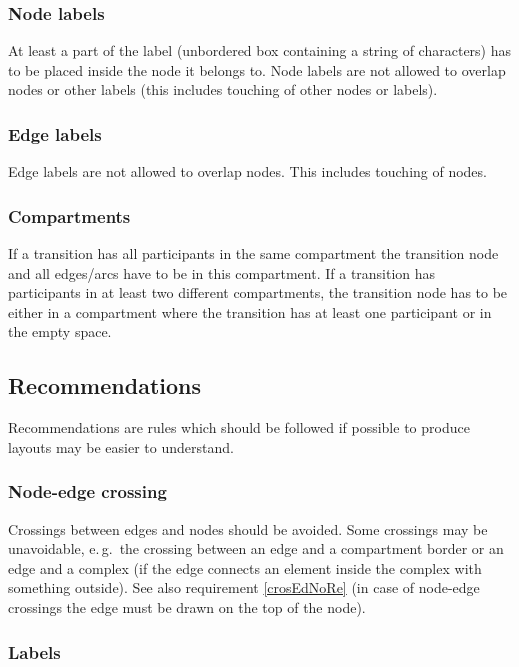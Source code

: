 \subsubsection{Node labels}

At least a part of the label (unbordered box containing a string of
characters) has to be placed inside the node it belongs to. Node
labels are not allowed to overlap nodes or other labels (this
includes touching of other nodes or labels).

\subsubsection{Edge labels}

Edge labels are not allowed to overlap nodes. This includes touching
of nodes.

\subsubsection{Compartments}

If a transition has all participants in the same compartment the
transition node and all edges/arcs have to be in this compartment.
If a transition has participants in at least two different
compartments, the transition node has to be either in a compartment
where the transition has at least one participant or in the empty
space.

\subsection{Recommendations}

Recommendations are rules which should be followed if possible to
produce layouts may be easier to understand.

\subsubsection{Node-edge crossing}\label{crosEdNo}

Crossings between edges and nodes should be avoided. Some crossings
may be unavoidable, e.\,g.~the crossing between an edge and a
compartment border or an edge and a complex (if the edge connects an
element inside the complex with something outside). See also
requirement \ref{crosEdNoRe} (in case of node-edge crossings the
edge must be drawn on the top of the node).

\subsubsection{Labels}

